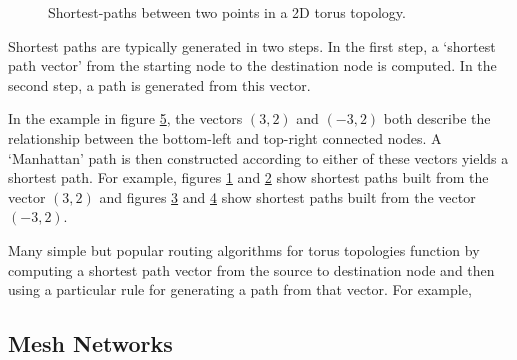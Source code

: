 			\begin{figure}
				\center
				\begin{subfigure}[b]{0.24\linewidth}
					\center
					\caption{}
					\label{fig:shortest-paths-dor}
				\end{subfigure}%
				\begin{subfigure}[b]{0.24\linewidth}
					\center
					\caption{}
					\label{fig:shortest-paths-zig-zag}
				\end{subfigure}%
				\begin{subfigure}[b]{0.24\linewidth}
					\center
					\caption{}
					\label{fig:shortest-paths-wrap-dor}
				\end{subfigure}%
				\begin{subfigure}[b]{0.24\linewidth}
					\center
					\caption{}
					\label{fig:shortest-paths-wrap-zig-zag}
				\end{subfigure}%
				
				\caption{Shortest-paths between two points in a 2D torus topology.}
				\label{fig:shortest-paths}
			\end{figure}
			
			Shortest paths are typically generated in two steps. In the first step, a
			`shortest path vector' from the starting node to the destination node is
			computed. In the second step, a path is generated from this vector.
			
			In the example in figure \ref{fig:shortest-paths}, the vectors $(3, 2)$ and
			$(-3, 2)$ both describe the relationship between the bottom-left and
			top-right connected nodes. A `Manhattan' path is then constructed according
			to either of these vectors yields a shortest path. For example, figures
			\ref{fig:shortest-paths-dor} and \ref{fig:shortest-paths-zig-zag} show
			shortest paths built from the vector $(3, 2)$ and figures
			\ref{fig:shortest-paths-wrap-dor} and \ref{fig:shortest-paths-wrap-zig-zag}
			show shortest paths built from the vector $(-3, 2)$.
			
			Many simple but popular routing algorithms for torus topologies function by
			computing a shortest path vector from the source to destination node and
			then using a particular rule for generating a path from that vector. For
			example, 
	
		\subsection{Mesh Networks}
			
